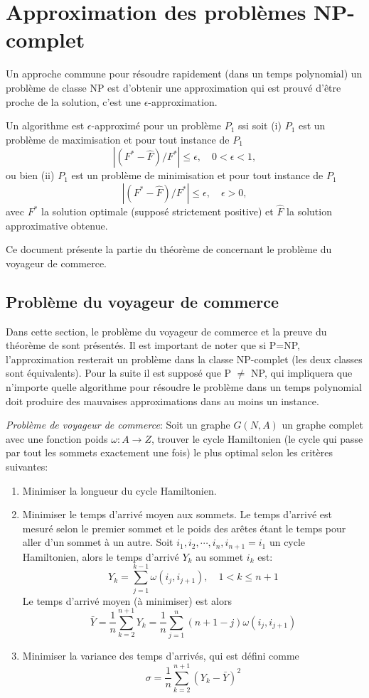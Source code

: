 \documentclass[../main.tex]{subfiles}
\begin{document}
\section{Approximation des problèmes NP-complet}
Un approche commune pour résoudre rapidement (dans un temps polynomial) un problème de classe NP est d'obtenir une approximation qui est prouvé d'être proche de la solution, c'est une $\epsilon$-approximation.

\begin{definition}
Un algorithme est $\epsilon$-approximé pour un problème $P_1$ ssi soit (i) $P_1$ est un problème de maximisation et pour tout instance de $P_1$
\[
|(F^* - \hat{F})/F^*| \leq \epsilon, \quad 0 < \epsilon < 1,
\]
ou bien (ii) $P_1$ est un problème de minimisation et pour tout instance de $P_1$
\[
|(F^* - \hat{F})/F^*| \leq \epsilon, \quad \epsilon > 0,
\]
avec $F^*$ la solution optimale (supposé strictement positive) et $\hat{F}$ la solution approximative obtenue.
\end{definition}

Ce document présente la partie du théorème de \cite{Sahni1976} concernant le problème du voyageur de commerce.

\subsection{Problème du voyageur de commerce}
Dans cette section, le problème du voyageur de commerce et la preuve du théorème de \cite{Sahni1976} sont présentés. Il est important de noter que si P=NP, l'approximation resterait un problème dans la classe NP-complet (les deux classes sont équivalents). Pour la suite il est supposé que P $\neq$ NP, qui impliquera que n'importe quelle algorithme pour résoudre le problème dans un temps polynomial doit produire des mauvaises approximations dans au moins un instance.

\noindent \emph{Problème de voyageur de commerce}: Soit un graphe $G(N, A)$ un graphe complet avec une fonction poids $\omega : A \rightarrow Z$, trouver le cycle Hamiltonien (le cycle qui passe par tout les sommets exactement une fois) le plus optimal selon les critères suivantes:
\begin{enumerate}
\item Minimiser la longueur du cycle Hamiltonien.
\item Minimiser le temps d'arrivé moyen aux sommets. Le temps d'arrivé est mesuré selon le premier sommet et le poids des arêtes étant le temps pour aller d'un sommet à un autre. Soit $i_1, i_2, \cdots , i_n, i_{n+1}=i_1$ un cycle Hamiltonien, alors le temps d'arrivé $Y_k$ au sommet $i_k$ est:
\[
Y_k = \sum _{j = 1} ^{k-1} \omega (i_j, i_{j+1}), \quad 1 < k \leq n+1
\]
Le temps d'arrivé moyen (à minimiser) est alors
\[
\bar{Y} = \frac{1}{n} \sum _{k = 2} ^{n+1} Y_k = \frac{1}{n} \sum _{j = 1} ^{n} (n+1-j)\omega (i_j, i_{j+1})
\]
\item Minimiser la variance des temps d'arrivés, qui est défini comme
\[
\sigma = \frac{1}{n}\sum_{k = 2}^{n+1} (Y_k - \bar{Y})^2
\]
\end{enumerate}
\end{document}
